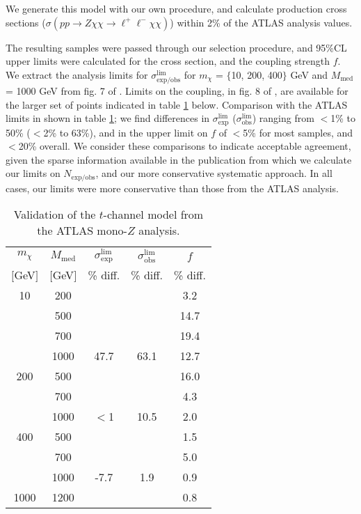 \begin{flushleft}
We generate this model with our own procedure, and calculate production cross sections ($\sigma(p p \rightarrow Z \chi \chi \rightarrow \ell^+ \ell^- \chi \chi)$) within 2\% of the ATLAS analysis values.


The resulting samples were passed through our selection procedure, and 95\%CL upper limits were calculated for the cross section, and the coupling strength $f$. We extract the analysis limits for $\sigma_{\mathrm{exp/obs}}^{\mathrm{lim}}$ for $m_{\chi}$ = $\{$10, 200, 400$\}$ GeV and $M_{\mathrm{med}}$ = 1000 GeV from fig. 7 of \cite{ATLASmonoZ}. Limits on the coupling, in fig. 8 of \cite{ATLASmonoZ}, are available for the larger set of points indicated in table \ref{tab:monoZval} below. Comparison with the ATLAS limits in shown in table \ref{tab:monoZval}; we find differences in $\sigma_{\mathrm{exp}}^{\mathrm{lim}}$ ($\sigma_{\mathrm{obs}}^{\mathrm{lim}}$) ranging from $<$1\% to 50\% ($<$2\% to 63\%), and in the upper limit on $f$ of $<$5\% for most samples, and $<$20\% overall. We consider these comparisons to indicate acceptable agreement, given the sparse information available in the publication from which we calculate our limits on $N_{\mathrm{exp/obs}}$, and our more conservative systematic approach. In all cases, our limits were more conservative than those from the ATLAS analysis.

\begin{table}
\begin{center}
\begin{tabular}{|c c | c c c|}
\hline
\hline
$m_{\chi}$ & $M_{\mathrm{med}}$ & $\sigma_{\mathrm{exp}}^{\mathrm{lim}}$ & $\sigma_{\mathrm{obs}}^{\mathrm{lim}}$ & $f$ \\
$[$GeV$]$ & $[$GeV$]$ & \% diff. & \% diff. & \% diff. \\
\hline
10 & 200 & & & 3.2 \\
   & 500 & & & 14.7 \\
   & 700 & & & 19.4  \\
   & 1000  & 47.7 & 63.1 & 12.7  \\
200   & 500  & & & 16.0  \\
   & 700  & & & 4.3  \\
   & 1000  & $<$1 & 10.5 & 2.0  \\
400   & 500  & & & 1.5  \\
   & 700  & & & 5.0  \\
   & 1000  & -7.7 & 1.9 & 0.9  \\
1000   & 1200  & & & 0.8  \\
\hline
\end{tabular}
\end{center}
\caption{Validation of the $t$-channel model from the ATLAS mono-$Z$ analysis.}
\label{tab:monoZval}
\end{table}


\end{flushleft}

